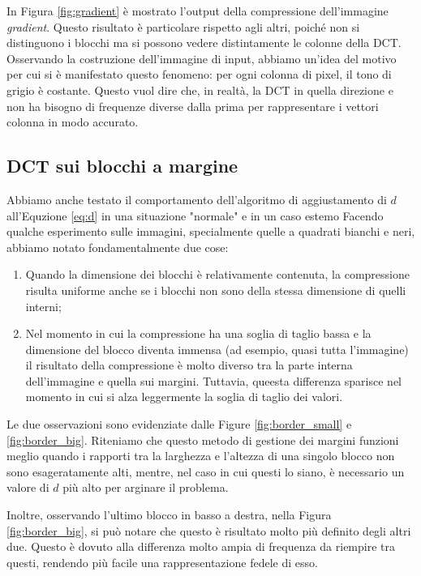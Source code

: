 In Figura \ref{fig:gradient} è mostrato l'output della compressione dell'immagine \textit{gradient}. Questo risultato è particolare rispetto agli altri, poiché non si distinguono i blocchi ma si possono vedere distintamente le colonne della DCT. Osservando la costruzione dell'immagine di input, abbiamo un'idea del motivo per cui si è manifestato questo fenomeno: per ogni colonna di pixel, il tono di grigio è costante. Questo vuol dire che, in realtà, la DCT in quella direzione e non ha bisogno di frequenze diverse dalla prima per rappresentare i vettori colonna in modo accurato.



\subsection{DCT sui blocchi a margine}
Abbiamo anche testato il comportamento dell'algoritmo di aggiustamento di $d$ all'Equzione \ref{eq:d} in una situazione "normale" e in un caso estemo
Facendo qualche esperimento sulle immagini, specialmente quelle a quadrati bianchi e neri, abbiamo notato fondamentalmente due cose:
\begin{enumerate}
	\item Quando la dimensione dei blocchi è relativamente contenuta, la compressione risulta uniforme anche se i blocchi non sono della stessa dimensione di quelli interni;
	\item Nel momento in cui la compressione ha una soglia di taglio bassa e la dimensione del blocco diventa immensa (ad esempio, quasi tutta l'immagine) il risultato della compressione è molto diverso tra la parte interna dell'immagine e quella sui margini. Tuttavia, queesta differenza sparisce nel momento in cui si alza leggermente la soglia di taglio dei valori.
\end{enumerate}
Le due osservazioni sono evidenziate dalle Figure \ref{fig:border_small} e \ref{fig:border_big}. Riteniamo che questo metodo di gestione dei margini funzioni meglio quando i rapporti tra la larghezza e l'altezza di una singolo blocco non sono esageratamente alti,  mentre, nel caso in cui questi lo siano, è necessario un valore di $d$ più alto per arginare il problema. 

Inoltre, osservando l'ultimo blocco in basso a destra, nella Figura \ref{fig:border_big}, si può notare che questo è risultato molto più definito degli altri due. Questo è dovuto alla differenza molto ampia di frequenza da riempire tra questi, rendendo più facile una rappresentazione fedele di esso.



